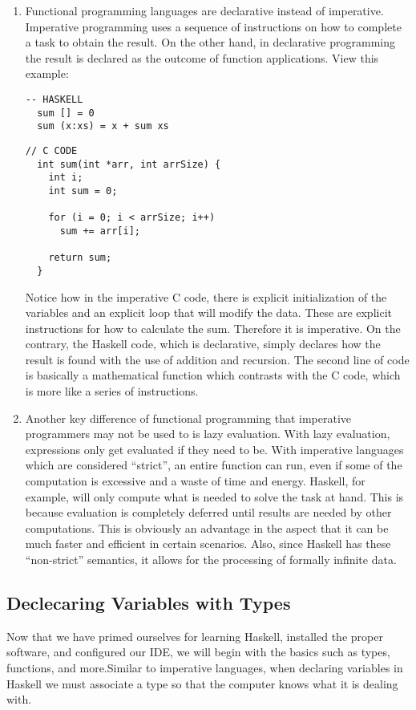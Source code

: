 \documentclass{article}
\begin{document}
\begin{enumerate}
  \item Functional programming languages are declarative instead of imperative. Imperative programming uses a sequence of instructions on how to complete a task to obtain the result. On the other hand, in declarative programming the result is declared as the outcome of function applications. View this example:

  \begin{lstlisting}[style=HaskellStyle]
  -- HASKELL
  sum [] = 0
  sum (x:xs) = x + sum xs
  \end{lstlisting}

  \begin{lstlisting}[style=CStyle]
  // C CODE
  int sum(int *arr, int arrSize) {
    int i;
    int sum = 0;
  
    for (i = 0; i < arrSize; i++)
      sum += arr[i];
  
    return sum;
  }
  \end{lstlisting}

  Notice how in the imperative C code, there is explicit initialization of the variables and an explicit loop that will modify the data. These are explicit instructions for how to calculate the sum. Therefore it is imperative. On the contrary, the Haskell code, which is declarative, simply declares how the result is found with the use of addition and recursion. The second line of code is basically a mathematical function which contrasts with the C code, which is more like a series of instructions.

  \item Another key difference of functional programming that imperative programmers may not be used to is lazy evaluation. With lazy evaluation, expressions only get evaluated if they need to be. With imperative languages which are considered “strict”, an entire function can run, even if some of the computation is excessive and a waste of time and energy. Haskell, for example, will only compute what is needed to solve the task at hand. This is because evaluation is completely deferred until results are needed by other computations. This is obviously an advantage in the aspect that it can be much faster and efficient in certain scenarios. Also, since Haskell has these “non-strict” semantics, it allows for the processing of formally infinite data.
\end{enumerate}

\subsection{Declecaring Variables with Types}
\medskip\noindent
Now that we have primed ourselves for learning Haskell, installed the proper software, and configured our IDE, we will begin with the basics such as types, functions, and more.Similar to imperative languages, when declaring variables in Haskell we must associate a type so that the computer knows what it is dealing with. 
\end{document}
